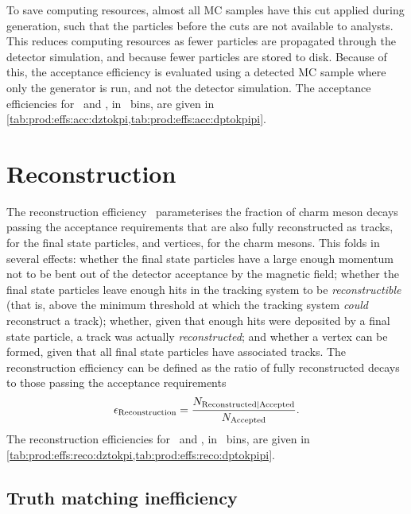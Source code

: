 To save computing resources, almost all \ac{MC} samples have this cut applied 
during generation, such that the particles before the cuts are not available to 
analysts.
This reduces computing resources as fewer particles are propagated through the 
detector simulation, and because fewer particles are stored to disk.
Because of this, the acceptance efficiency is evaluated using a detected 
\ac{MC} sample where only the generator is run, and not the detector 
simulation.
The acceptance efficiencies for \DzToKpi\ and \DpToKpipi, in \pTy\ bins, are 
given in \cref{tab:prod:effs:acc:dztokpi,tab:prod:effs:acc:dptokpipi}.

\section{Reconstruction}
\label{chap:prod:effs:acc}

The reconstruction efficiency \effreco\ parameterises the fraction of charm meson decays passing the acceptance requirements that are also fully reconstructed as tracks, for the final state particles, and vertices, for the charm mesons.
This folds in several effects: whether the final state particles have a large enough momentum not to be bent out of the detector acceptance by the magnetic field; whether the final state particles leave enough hits in the tracking system to be \emph{reconstructible} (that is, above the minimum threshold at which the tracking system \emph{could} reconstruct a track); whether, given that enough hits were deposited by a final state particle, a track was actually \emph{reconstructed}; and whether a vertex can be formed, given that all final state particles have associated tracks.
The reconstruction efficiency can be defined as the ratio of fully reconstructed decays to those passing the acceptance requirements
\begin{equation}
  \effreco = \frac{%
    N_{\text{Reconstructed}|\text{Accepted}}
  }
  {%
    N_{\text{\text{Accepted}}}
  }.
  \label{eqn:prod:effs:reco}
\end{equation}
The reconstruction efficiencies for \DzToKpi\ and \DpToKpipi, in \pTy\ bins, are 
given in \cref{tab:prod:effs:reco:dztokpi,tab:prod:effs:reco:dptokpipi}.

\subsection{Truth matching inefficiency}
\label{chap:prod:effs:truth}

